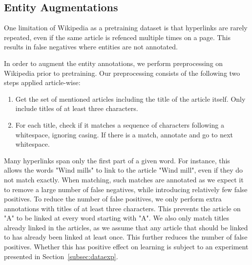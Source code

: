 \documentclass[main.tex]{subfiles}
\begin{document}
\subsection{Entity Augmentations}
\label{subsec:entaug}
One limitation of Wikipedia as a pretraining dataset is that hyperlinks are rarely repeated, even if the same article is refenced multiple times on a page.
This results in false negatives where entities are not annotated.

In order to augment the entity annotations, we perform preprocessing on Wikipedia prior to pretraining.
Our preprocessing consists of the following two steps applied article-wise:
\begin{enumerate}
    \item Get the set of mentioned articles including the title of the article itself.
    Only include titles of at least three characters.
    \item For each title, check if it matches a sequence of characters following a whitespace, ignoring casing.
    If there is a match, annotate and go to next whitespace.
\end{enumerate}
Many hyperlinks span only the first part of a given word.
For instance, this allows the words "Wind mills" to link to the article "Wind mill", even if they do not match exactly.
When matching, such matches are annotated as we expect it to remove a large number of false negatives, while introducing relatively few false positives.
To reduce the number of false positives, we only perform extra annotations with titles of at least three characters.
This prevents the article on "A" to be linked at every word starting with "A".
We also only match titles already linked in the articles, as we assume that any article that should be linked to has already been linked at least once.
This further reduces the number of false positives.
Whether this has positive effect on learning is subject to an experiment presented in Section~\ref{subsec:dataexp}.
\end{document}
